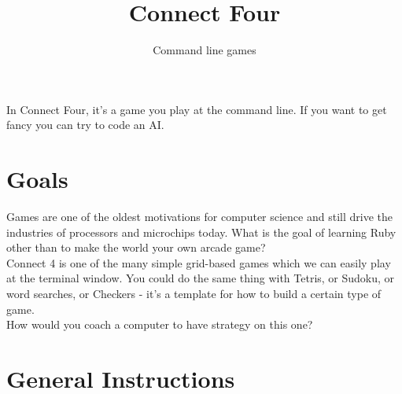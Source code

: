 \documentclass{42-en}
\begin{document}
\title{Connect Four}
\subtitle{Command line games}


\summary
{
In Connect Four, it's a game you play at the command line. If you want to get fancy you can try to code an AI. 
}

\maketitle

\tableofcontents


\startexercices



\chapter{Goals}

Games are one of the oldest motivations for computer science and still drive the industries of processors and microchips today. What is the goal of learning Ruby other than to make the world your own arcade game? \\

Connect 4 is one of the many simple grid-based games which we can easily play at the terminal window. You could do the same thing with Tetris, or Sudoku, or word searches, or Checkers - it's a template for how to build a certain type of game. \\

How would you coach a computer to have strategy on this one?



\chapter{General Instructions}
\end{document}
